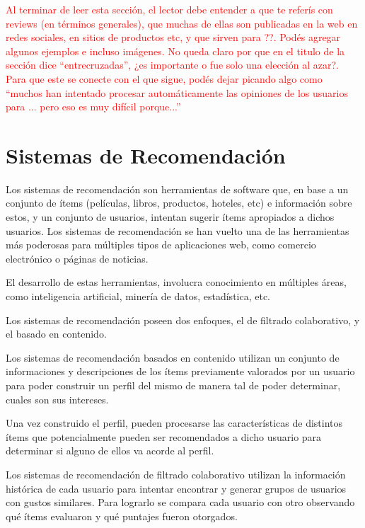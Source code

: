 \begin{framed}
\textcolor{red}{Al terminar de leer esta sección, el lector debe entender a que te referís con reviews (en términos generales), que muchas de ellas son publicadas en la web en redes sociales, en sitios de productos etc, y que sirven para ??. Podés agregar algunos ejemplos e incluso imágenes. No queda claro por que en el titulo de la sección dice ``entrecruzadas'', ¿es importante o fue solo una elección al azar?. Para que este se conecte con el que sigue, podés dejar picando algo como ``muchos han intentado procesar automáticamente las opiniones de los usuarios para ... pero eso es muy difícil porque...'' }
\end{framed}


\section{Sistemas de Recomendación}
\label{section:sistemas-de-recomendacion}
Los sistemas de recomendación son herramientas de software que, en base a un conjunto de ítems (películas, libros, productos, hoteles, etc) e información sobre estos, y un conjunto de usuarios, intentan sugerir ítems apropiados a dichos usuarios. Los sistemas de recomendación se han vuelto una de las herramientas más poderosas para múltiples tipos de aplicaciones web, como comercio electrónico o páginas de noticias. 

El desarrollo de estas herramientas, involucra conocimiento en múltiples áreas, como inteligencia artificial, minería de datos, estadística, etc. 

Los sistemas de recomendación poseen dos enfoques, el de filtrado colaborativo, y el basado en contenido.

Los sistemas de recomendación basados en contenido utilizan un conjunto de informaciones y descripciones de los ítems previamente valorados por un usuario para poder construir un perfil del mismo de manera tal de poder determinar, cuales son sus intereses.

Una vez construido el perfil, pueden procesarse las características de distintos ítems que potencialmente pueden ser recomendados a dicho usuario para determinar si alguno de ellos va acorde al perfil.

Los sistemas de recomendación de filtrado colaborativo utilizan la información histórica de cada usuario para intentar encontrar y generar grupos de usuarios con gustos similares. Para lograrlo se compara cada usuario con otro observando qué ítems evaluaron y qué puntajes fueron otorgados. 

